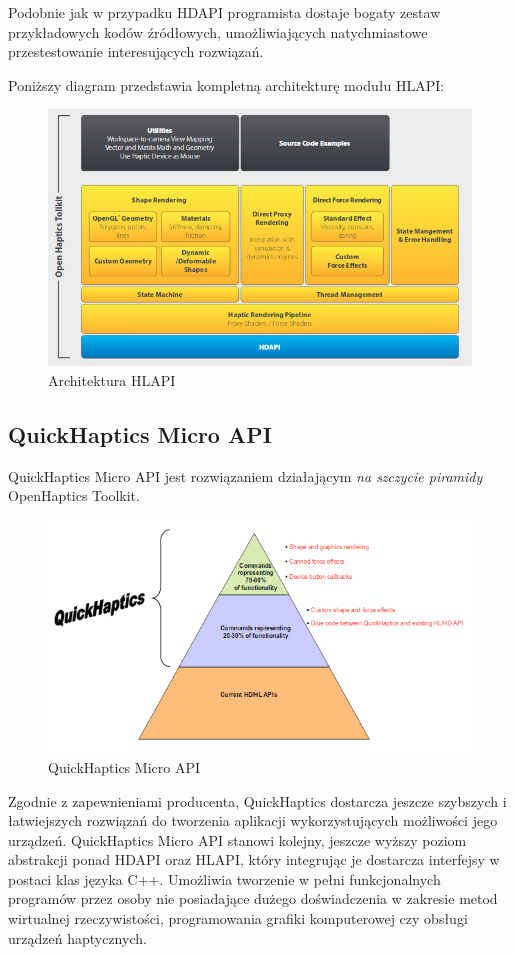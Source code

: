 \documentclass[licencjacka]{pracamgr}
\begin{document}
Podobnie jak w przypadku HDAPI programista dostaje bogaty zestaw przykładowych kodów źródłowych, umożliwiających natychmiastowe przestestowanie interesujących rozwiązań.

Poniższy diagram przedstawia kompletną architekturę modułu HLAPI:

\begin{figure}[H]
\centering
\includegraphics[scale=0.65,center]{hlapi}
\caption{Architektura HLAPI}
\end{figure}

\subsection{QuickHaptics Micro API}
QuickHaptics Micro API jest rozwiązaniem działającym \textit{na szczycie piramidy} OpenHaptics Toolkit.
\begin{figure}[H]
\centering
\includegraphics[scale=0.6,center]{quickhaptics}
\caption{QuickHaptics Micro API}
\end{figure}

Zgodnie z zapewnieniami producenta, QuickHaptics dostarcza jeszcze szybszych i łatwiejszych rozwiązań do tworzenia aplikacji wykorzystujących możliwości jego urządzeń. QuickHaptics Micro API stanowi kolejny, jeszcze wyższy poziom abstrakcji ponad HDAPI oraz HLAPI, który integrując je dostarcza interfejsy w postaci klas języka C++. Umożliwia tworzenie w pełni funkcjonalnych programów przez osoby nie posiadające dużego doświadczenia w zakresie metod wirtualnej rzeczywistości, programowania grafiki komputerowej czy obsługi urządzeń haptycznych.
\end{document}
